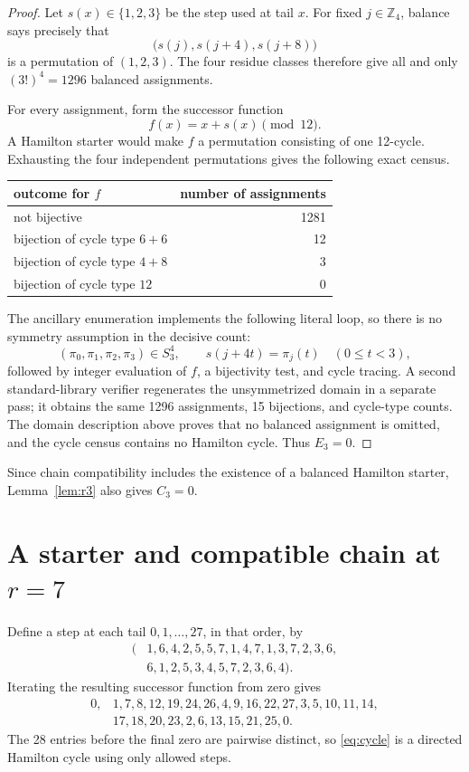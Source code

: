 \documentclass[11pt]{article}
\newcommand{\Z}{\mathbb Z}
\begin{document}
\begin{proof}
Let \(s(x)\in\{1,2,3\}\) be the step used at tail \(x\).  For fixed
\(j\in\Z_4\), balance says precisely that
\[
  \bigl(s(j),s(j+4),s(j+8)\bigr)
\]
is a permutation of \((1,2,3)\).  The four residue classes therefore give
all and only \((3!)^4=1296\) balanced assignments.

For every assignment, form the successor function
\[
  f(x)=x+s(x)\pmod {12}.
\]
A Hamilton starter would make \(f\) a permutation consisting of one
12-cycle.  Exhausting the four independent permutations gives the following
exact census.
\begin{center}
\begin{tabular}{lr}
\toprule
outcome for \(f\) & number of assignments\\
\midrule
not bijective & 1281\\
bijection of cycle type \(6+6\) & 12\\
bijection of cycle type \(4+8\) & 3\\
bijection of cycle type \(12\) & 0\\
\bottomrule
\end{tabular}
\end{center}
The ancillary enumeration implements the following literal loop, so there is
no symmetry assumption in the decisive count:
\[
  (\pi_0,\pi_1,\pi_2,\pi_3)\in S_3^4,
  \qquad s(j+4t)=\pi_j(t)\quad(0\leq t<3),
\]
followed by integer evaluation of \(f\), a bijectivity test, and cycle
tracing.  A second standard-library verifier regenerates the unsymmetrized
domain in a separate pass; it obtains the same 1296 assignments, 15
bijections, and cycle-type counts.  The domain description above proves that
no balanced assignment is omitted, and the cycle census contains no
Hamilton cycle.  Thus \(E_3=0\).
\end{proof}

Since chain compatibility includes the existence of a balanced Hamilton
starter, Lemma~\ref{lem:r3} also gives \(C_3=0\).

\section{A starter and compatible chain at \texorpdfstring{\(r=7\)}{r=7}}

Define a step at each tail \(0,1,\ldots,27\), in that order, by
\begin{equation}\label{eq:tailword}
\begin{split}
(&1,6,4,2,5,5,7,1,4,7,1,3,7,2,3,6,\\
 &6,1,2,5,3,4,5,7,2,3,6,4).
\end{split}
\end{equation}
Iterating the resulting successor function from zero gives
\begin{equation}\label{eq:cycle}
\begin{split}
0,&1,7,8,12,19,24,26,4,9,16,22,27,3,5,10,11,14,\\
  &17,18,20,23,2,6,13,15,21,25,0.
\end{split}
\end{equation}
The 28 entries before the final zero are pairwise distinct, so
\eqref{eq:cycle} is a directed Hamilton cycle using only allowed steps.
\end{document}
